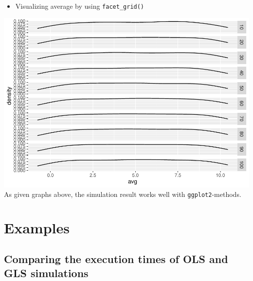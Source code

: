 \documentclass[11pt,a4paper]{article}
\newenvironment{Shaded}{\begin{snugshade}}{\end{snugshade}}
\newcommand{\AttributeTok}[1]{\textcolor[rgb]{0.77,0.63,0.00}{#1}}
\newcommand{\FunctionTok}[1]{\textcolor[rgb]{0.00,0.00,0.00}{#1}}
\newcommand{\NormalTok}[1]{#1}
\newcommand{\SpecialCharTok}[1]{\textcolor[rgb]{0.00,0.00,0.00}{#1}}
\begin{document}
\begin{itemize}
\tightlist
\item
  Visualizing average by using \texttt{facet\_grid()}
\end{itemize}

\begin{Shaded}
\end{Shaded}

\includegraphics{Abschlussarbeit_01_Sep_files/figure-latex/facet-1.pdf}
As given graphs above, the simulation result works well with
\texttt{ggplot2}-methods.

\pagebreak

\hypertarget{examples}{%
\section{Examples}\label{examples}}

\hypertarget{comparing-the-execution-times-of-ols-and-gls-simulations}{%
\subsection{Comparing the execution times of OLS and GLS
simulations}\label{comparing-the-execution-times-of-ols-and-gls-simulations}}
\end{document}
